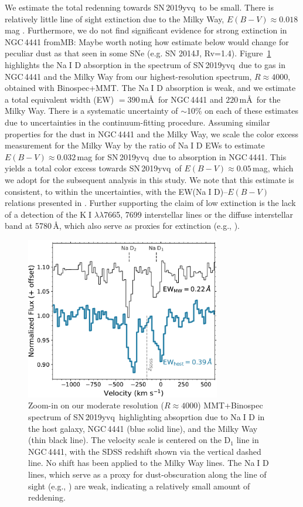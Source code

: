 \documentclass[twocolumn]{aastex63}
\def\ion#1#2{#1$\;${\footnotesize\rm{#2}}\relax}
\newcommand{\frommb}[1]{{\color{purple} fromMB: {#1}}}
\newcommand{\sn}{SN\,2019yvq}
\begin{document}
We estimate the total redenning towards \sn\ to be small. There is
relatively little line of sight extinction due to the Milky Way, $E(B-V)
\approx 0.018$\,mag \citep{Schlafly11, Schlegel98}. Furthermore, we do not
find significant evidence for strong extinction in NGC\,4441 \frommb{Maybe
worth noting how estimate below would change for peculiar dust as that seen
in some SNe (e.g. SN 2014J, Rv=1.4)}. Figure~\ref{fig:NaD} highlights the
\ion{Na}{I} D absorption in the spectrum of \sn\ due to gas in NGC\,4441 and
the Milky Way from our highest-resolution spectrum, $R \approx 4000$,
obtained with Binospec+MMT. The \ion{Na}{I} D absorption is weak, and we
estimate a total equivalent width (EW) $= 390$\,m\AA\ for NGC\,4441 and
$220$\,m\AA\ for the Milky Way. There is a systematic uncertainty of
$\sim$10\% on each of these estimates due to uncertainties in the
continuum-fitting procedure. Assuming similar properties for the dust in
NGC\,4441 and the Milky Way, we scale the color excess measurement for the
Milky Way by the ratio of \ion{Na}{I} D EWs to estimate $E(B-V) \approx
0.032$\,mag for \sn\ due to absorption in NGC\,4441. This yields a total
color excess towards \sn\ of $E(B-V) \approx 0.05$\,mag, which we adopt for
the subsequent analysis in this study. We note that this estimate is
consistent, to within the uncertainties, with the EW(\ion{Na}{I}
D)--$E(B-V)$ relations presented in \citet{Poznanski12}. Further supporting
the claim of low extinction is the lack of a detection of the \ion{K}{I}
$\lambda\lambda$7665, 7699 interstellar lines or the diffuse interstellar
band at 5780\,\AA, which also serve as proxies for extinction (e.g.,
\citealt{Phillips13}).

\begin{figure}
    \centering
    \includegraphics[width=3.35in]{./figures/NaD.pdf}
    \caption{Zoom-in on our moderate resolution ($R \approx 4000$)
    MMT+Binospec spectrum of \sn\ highlighting absoprtion due to \ion{Na}{I}
    D in the host galaxy, NGC\,4441 (blue solid line), and the Milky Way
    (thin black line). The velocity scale is centered on the D$_1$ line in
    NGC\,4441, with the SDSS redshift shown via the vertical dashed line. No
    shift has been applied to the Milky Way lines. The \ion{Na}{I} D lines,
    which serve as a proxy for dust-obscuration along the line of sight
    (e.g., \citealt{Poznanski12,Phillips13}) are weak, indicating a
    relatively small amount of reddening.}
    \label{fig:NaD}
\end{figure}
\end{document}
